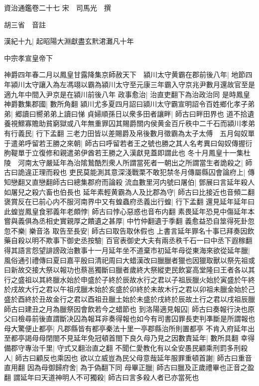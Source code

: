 資治通鑑卷二十七
宋　司馬光　撰

胡三省　音註

漢紀十九|{
	起昭陽大淵獻盡玄黓涒灘凡十年}


中宗孝宣皇帝下

神爵四年春二月以鳳皇甘露降集京師赦天下　潁川太守黄霸在郡前後八年|{
	地節四年潁川太守讓入為左馮翊以霸為潁川太守至元康三年霸入守京兆尹數月還故官至是適九年中間入尹京是在潁川前後八年}
政事愈治|{
	治直吏翻下為治政治同}
是時鳳皇神爵數集郡國|{
	數所角翻}
潁川尤多夏四月詔曰潁川太守霸宣明詔令百姓鄉化孝子弟弟|{
	郷讀曰嚮弟弟上讀曰悌}
貞婦順孫日以衆多田者讓畔|{
	師古曰畔田界也}
道不拾遺養視鰥寡贍助貧窮獄或八年無重罪囚其賜爵關内侯黄金百斤秩中二千石而潁川孝弟有行義民|{
	行下孟翻}
三老力田皆以差賜爵及帛後數月徵霸為太子太傅　五月匈奴單于遣弟呼留若王勝之來朝|{
	師古曰呼留若者王之號也勝之其人名考異曰匈奴傳握衍朐鞮單于立復修和親遣弟伊酋若王勝之入漢獻見蓋即謂此也}
冬十月鳳皇十一集杜陵　河南太守嚴延年為治隂鷙酷烈衆人所謂當死者一朝出之所謂當生者詭殺之|{
	師古曰詭違正理而殺也}
吏民莫能測其意深淺戰栗不敢犯禁冬月傳屬縣囚會論府上|{
	傳知戀翻又直戀翻師古曰總集郡府而論殺}
流血數里河内號曰屠伯|{
	鄧展曰言延年殺人如屠兒之殺六畜也伯長也}
延年素輕黄霸為人及比郡為守|{
	師古曰比接近也音頻二翻}
褒賞反在已前心内不服河南界中又有蝗蟲府丞義出行蝗|{
	行下孟翻}
還見延年延年曰此蝗豈鳳皇食邪義年老頗悖|{
	師古曰悖心惡惑也音布内翻}
素畏延年恐見中傷延年本嘗與義俱為丞相史實親厚之饋遺之甚厚|{
	中竹仲翻遺于季翻}
義愈益恐自筮得死卦忽忽不樂|{
	樂音洛}
取告至長安|{
	師古曰取告取休假也}
上書言延年罪名十事已拜奏因飲藥自殺以明不欺事下御史丞按驗|{
	百官表御史大夫有兩丞秩千石一曰中丞下遐稼翻}
得其語言怨望誹謗政治數事十一月延年坐不道棄市初延年母從東海來欲從延年臘|{
	風俗通引禮傳曰夏曰嘉平殷曰清祀周曰大蜡漢改曰臘臘者獵也因獵取獸以祭先祖或曰新故交接大祭以報功也蔡邕獨斷曰臘者歲終大祭縱吏民飲宴高堂隆曰王者各以其行之盛祖以其終臘水始於申盛於子終於辰故水行之君以子祖辰臘火始於寅盛於午終於戌故大行之君以午祖戌臘木始於亥盛於卯終於未故木行之君以卯祖未臘金始於己盛於酉終於丑故金行之君以酉祖丑臘土始於未盛於戌終於辰故土行之君以戌祖辰臘師古曰建丑之月為臘祭因會飲若今之蜡節也}
到洛陽適見報囚|{
	師古曰奏報行決也原父曰檢尋前後直謂斷决囚為報耳非奏得報也如今有司書囚罪長吏判凖斷是所謂報也}
母大驚便止都亭|{
	凡郡縣皆有都亭秦法十里一亭郡縣治所則置都亭}
不肯入府延年出至都亭謁母母閉閤不見延年免冠頓首閤下良久母乃見之因數責延年|{
	數所具翻}
幸得備郡守專治千里|{
	守式又翻治直之翻}
不聞仁愛教化有以全安愚民顧乘刑罰多刑殺人|{
	師古曰顧反也乘因也}
欲以立威豈為民父母意哉延年服罪重頓首謝|{
	師古曰重音直用翻}
因為母御歸府舍|{
	為于偽翻下同}
母畢正臘|{
	師古曰臘及正歲禮畢也正音之盈翻}
謂延年曰天道神明人不可獨殺|{
	師古曰言多殺人者已亦當死也}
